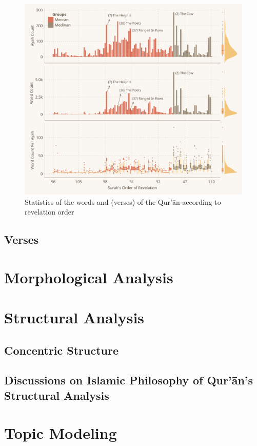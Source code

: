 \begin{figure}[!t]
    \centering
    \includegraphics[width=\textwidth]{img/plot2.pdf}
    \caption{Statistics of the words and   (verses) of the Qur'\=an according to revelation order}
    \label{fig:ch4_ayah_word_count_rev_order}
\end{figure}

\subsection{Verses}\label{sec:ch4_desc_stat_verse}
\section{Morphological Analysis}\label{sec:ch4_morphological_analysis}
\section{Structural Analysis}\label{sec:ch4_structural_analysis}
\subsection{Concentric Structure}
\subsection{Discussions on Islamic Philosophy of Qur'\=an's Structural Analysis}
\newpage
\section{Topic Modeling}\label{sec:ch4_topic_modeling_result}
